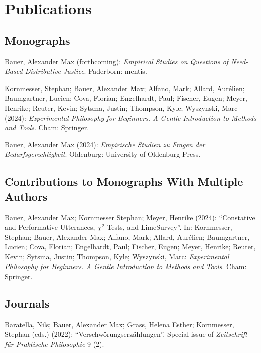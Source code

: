 \documentclass[a4paper,10pt]{article}
\newenvironment{literature}{%
   \parskip6pt\parindent0pt\raggedright
   \def\lititem{\hangindent=1cm\hangafter1}}{%
   \par\ignorespaces}
\begin{document}
\clearpage
\section{Publications}
\subsection*{Monographs}
\begin{literature}
\lititem Bauer, Alexander Max (forthcoming): \textit{Empirical Studies on Questions of Need-Based Distributive Justice}. Paderborn: mentis.

\lititem Kornmesser, Stephan; Bauer, Alexander Max; Alfano, Mark; Allard, Aurélien; Baumgartner, Lucien; Cova, Florian; Engelhardt, Paul; Fischer, Eugen; Meyer, Henrike; Reuter, Kevin; Sytsma, Justin; Thompson, Kyle; Wyszynski, Marc (2024): \textit{Experimental Philosophy for Beginners. A Gentle Introduction to Methods and Tools}. Cham: Springer.

\lititem Bauer, Alexander Max (2024): \textit{Empirische Studien zu Fragen der Bedarfsgerechtigkeit}. Oldenburg: University of Oldenburg Press.
\end{literature}

\subsection*{Contributions to Monographs With Multiple Authors}
\begin{literature}
\lititem Bauer, Alexander Max; Kornmesser Stephan; Meyer, Henrike (2024): \enquote{Constative and Performative Utterances, $\chi^2$ Tests, and LimeSurvey}. In: Kornmesser, Stephan; Bauer, Alexander Max; Alfano, Mark; Allard, Aurélien; Baumgartner, Lucien; Cova, Florian; Engelhardt, Paul; Fischer, Eugen; Meyer, Henrike; Reuter, Kevin; Sytsma, Justin; Thompson, Kyle; Wyszynski, Marc: \textit{Experimental Philosophy for Beginners. A Gentle Introduction to Methods and Tools}. Cham: Springer.
\end{literature}

\subsection*{Journals}
\begin{literature}
\lititem Baratella, Nils; Bauer, Alexander Max; Grass, Helena Esther; Kornmesser, Stephan (eds.) (2022): \enquote{Verschwörungserzählungen}. Special issue of \textit{Zeitschrift für Praktische Philosophie} 9 (2).
\end{literature}
\end{document}
